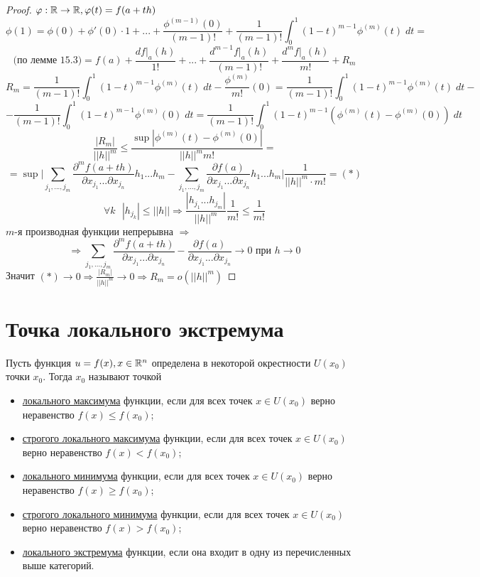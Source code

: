     \begin{proof}
    	$\varphi: \mathbb R \rightarrow \mathbb R, \varphi(t) = f(a + th)$
    	\[ \phi(1) = \phi(0) + \phi'(0) \cdot 1 + ... + \frac{\phi^{(m - 1)}(0)}{(m - 1)!} + \frac{1}{(m - 1)!} \int_0^1 (1 - t)^{m - 1} \phi^{(m)}(t) \; dt = \]
    	\[ \text{(по лемме 15.3)} = f(a) + \frac{df|_a(h)}{1!} + ... + \frac{d^{m - 1}f|_a(h)}{(m - 1)!} + \frac{d^m f|_a(h)}{m!} + R_m \]
    	\[ R_m = \frac{1}{(m - 1)!} \int_0^1 (1 - t)^{m - 1} \phi^{(m)}(t) \; dt - \frac{\phi^{(m)}}{m!}(0) =  \frac{1}{(m - 1)!} \int_0^1 (1 - t)^{m - 1} \phi^{(m)}(t) \; dt - \]
    	\[ - \frac{1}{(m - 1)!} \int_0^1 (1 - t)^{m - 1} \phi^{(m)}(0) \; dt = \frac{1}{(m - 1)!} \int_0^1 (1 - t)^{m - 1}(\phi^{(m)}(t) - \phi^{(m)}(0)) \; dt \]
    	\[ \frac{|R_m|}{||h||^m} \leqslant \frac{\sup{|\phi^{(m)}(t) - \phi^{(m)}(0)|}}{||h||^m m!} =  \]
    	\[ = \sup{\bigg|\sum_{j_1, ..., j_m} \frac{\partial^m f(a + th)}{\partial x_{j_1} ... \partial x_{j_n}} h_1 ... h_m - \sum_{j_1, ..., j_m} \frac{\partial f(a)}{\partial x_{j_1} ... \partial x_{j_n}} h_1 ... h_m \bigg|} \frac{1}{||h||^m \cdot m!} = (*) \]
    	\[ \forall k \text{ } |h_{j_k}| \leqslant ||h|| \Rightarrow \frac{|h_{j_1} ... h_{j_m}|}{||h||^m} \frac{1}{m!} \leqslant \frac{1}{m!} \]
    	$m$-я производная функции непрерывна $\Rightarrow$
    	\[ \Rightarrow \sum_{j_1, ..., j_m} \frac{\partial^m f(a + th)}{\partial x_{j_1} ... \partial x_{j_n}} - \frac{\partial f(a)}{\partial x_{j_1} ... \partial x_{j_n}} \to 0 \text{ при } h \to 0 \]
    	Значит $(*) \to 0 \Rightarrow \frac{|R_m|}{||h||^m} \to 0 \Rightarrow R_m = o(||h||^m)$
    \end{proof}
    
    \section{Точка локального экстремума}
    
    \begin{definition}
    	Пусть функция $u = f(x), x \in \mathbb R^n$ определена в некоторой окрестности $U(x_0)$ точки $x_0$. Тогда $x_0$ называют точкой
    	\begin{itemize}
    		\item \underline{локального максимума} функции, если для всех точек $x \in U(x_0)$ верно неравенство $f(x) \leqslant f(x_0)$;
    		\item \underline{строгого локального максимума} функции, если для всех точек $x \in U(x_0)$ верно неравенство $f(x) < f(x_0)$;
    		\item \underline{локального минимума} функции, если для всех точек $x \in U(x_0)$ верно неравенство $f(x) \geqslant f(x_0)$;
    		\item \underline{строгого локального минимума} функции, если для всех точек $x \in U(x_0)$ верно неравенство $f(x) > f(x_0)$;
    		\item \underline{локального экстремума} функции, если она входит в одну из перечисленных выше категорий.
    	\end{itemize}
    \end{definition}
    
